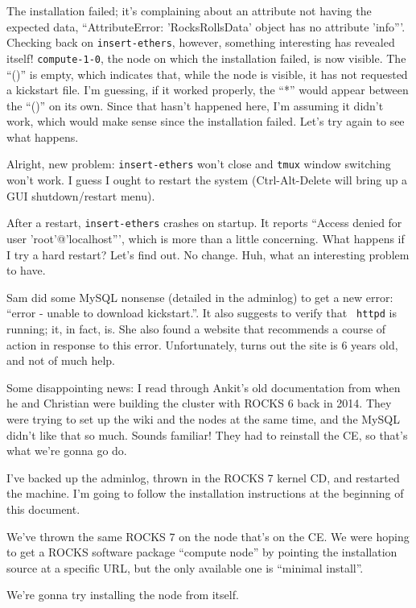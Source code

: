 \documentclass[12pt]{article}
\begin{document}
\qq The installation failed; it's complaining about an attribute not having the
expected data, ``AttributeError: 'RocksRollsData' object has no attribute
'info'''. Checking back on {\tt insert-ethers}, however, something interesting
has revealed itself! {\tt compute-1-0}, the node on which the installation
failed, is now visible. The ``()'' is empty, which indicates that, while the
node is visible, it has not requested a kickstart file. I'm guessing, if it
worked properly, the ``*'' would appear between the ``()'' on its own. Since
that hasn't happened here, I'm assuming it didn't work, which would make sense
since the installation failed. Let's try again to see what happens.

\qq Alright, new problem: {\tt insert-ethers} won't close and {\tt tmux} window
switching won't work. I guess I ought to restart the system (Ctrl-Alt-Delete
will bring up a GUI shutdown/restart menu). 

\qq After a restart, {\tt insert-ethers} crashes on startup. It reports ``Access
denied for user 'root'@'localhost''', which is more than a little
concerning. What happens if I try a hard restart? Let's find out. No
change. Huh, what an interesting problem to have.

\qq Sam did some MySQL nonsense (detailed in the adminlog) to get a new error:
``error - unable to download kickstart.''. It also suggests to verify that {\tt
  httpd} is running; it, in fact, is. She also found a website that recommends a
course of action in response to this error. Unfortunately, turns out the site is
6 years old, and not of much help.

\qq Some disappointing news: I read through Ankit's old documentation from when
he and Christian were building the cluster with ROCKS 6 back in 2014. They were
trying to set up the wiki and the nodes at the same time, and the MySQL didn't
like that so much. Sounds familiar! They had to reinstall the CE, so that's what
we're gonna go do.

\qq I've backed up the adminlog, thrown in the ROCKS 7 kernel CD, and restarted
the machine. I'm going to follow the installation instructions at the beginning
of this document.

\qq We've thrown the same ROCKS 7 on the node that's on the CE. We were hoping
to get a ROCKS software package ``compute node'' by pointing the installation
source at a specific URL, but the only available one is ``minimal install''. 

\qq We're gonna try installing the node from itself.
\end{document}
